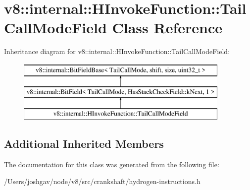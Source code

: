 \hypertarget{classv8_1_1internal_1_1_h_invoke_function_1_1_tail_call_mode_field}{}\section{v8\+:\+:internal\+:\+:H\+Invoke\+Function\+:\+:Tail\+Call\+Mode\+Field Class Reference}
\label{classv8_1_1internal_1_1_h_invoke_function_1_1_tail_call_mode_field}
Inheritance diagram for v8\+:\+:internal\+:\+:H\+Invoke\+Function\+:\+:Tail\+Call\+Mode\+Field\+:\begin{figure}[H]
\begin{center}
\leavevmode
\includegraphics[height=3.000000cm]{classv8_1_1internal_1_1_h_invoke_function_1_1_tail_call_mode_field}
\end{center}
\end{figure}
\subsection*{Additional Inherited Members}


The documentation for this class was generated from the following file\+:\begin{DoxyCompactItemize}
\item 
/\+Users/joshgav/node/v8/src/crankshaft/hydrogen-\/instructions.\+h\end{DoxyCompactItemize}
